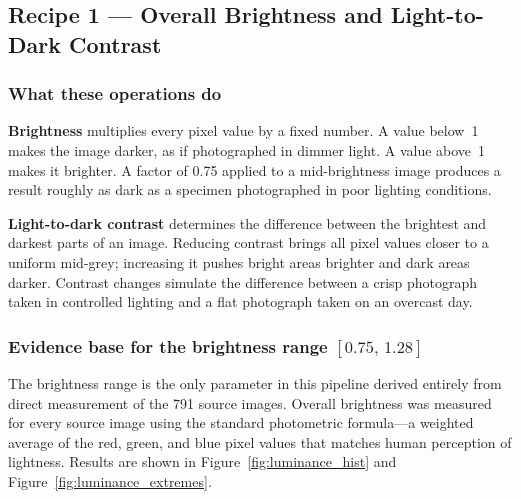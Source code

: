 \documentclass[11pt,a4paper]{article}
\begin{document}
\subsection{Recipe 1 --- Overall Brightness and Light-to-Dark Contrast}
\label{subsec:recipe1}

\subsubsection*{What these operations do}

\textbf{Brightness} multiplies every pixel value by a fixed number. A value below~1 makes the image darker, as if photographed in dimmer light. A value above~1 makes it brighter. A factor of 0.75 applied to a mid-brightness image produces a result roughly as dark as a specimen photographed in poor lighting conditions.

\textbf{Light-to-dark contrast} determines the difference between the brightest and darkest parts of an image. Reducing contrast brings all pixel values closer to a uniform mid-grey; increasing it pushes bright areas brighter and dark areas darker. Contrast changes simulate the difference between a crisp photograph taken in controlled lighting and a flat photograph taken on an overcast day.

\subsubsection*{Evidence base for the brightness range $[0.75,\,1.28]$}

The brightness range is the only parameter in this pipeline derived entirely from direct measurement of the 791 source images. Overall brightness was measured for every source image using the standard photometric formula---a weighted average of the red, green, and blue pixel values that matches human perception of lightness. Results are shown in Figure~\ref{fig:luminance_hist} and Figure~\ref{fig:luminance_extremes}.
\end{document}
